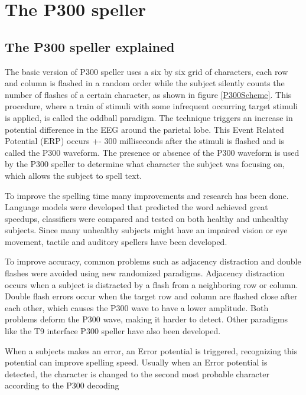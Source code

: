 \section{The P300 speller}
\subsection{The P300 speller explained}
The basic version of P300 speller uses a six by six grid of characters, each row and column is flashed in a random order while the subject silently counts the number of flashes of a certain character, as shown in figure \ref{P300Scheme}. This procedure, where a train of stimuli with some infrequent occurring target stimuli is applied, is called the oddball paradigm. The technique triggers an increase in potential difference in the EEG around the parietal lobe. This Event Related Potential (ERP) occurs +- 300 milliseconds after the stimuli is flashed and is called the P300 waveform\cite{ComparisonClassifications}. The presence or absence of the P300 waveform is used by the P300 speller to determine what character the subject was focusing on, which allows the subject to spell text. 


To improve the spelling time many improvements and research has been done. Language models were developed that predicted the word achieved great speedups\cite{LangModel}, classifiers were compared and tested on both healthy\cite{ClassTechniqueComp} and unhealthy subjects\cite{ComparisonClassifications}. Since many unhealthy subjects might have an impaired vision or eye movement, tactile\cite{TactileP300} and auditory\cite{AuditoryP300} spellers have been developed.

\npar

To improve accuracy, common problems such as adjacency distraction and double flashes were avoided using new randomized paradigms\cite{PaperThibault}. Adjacency distraction occurs when a subject is distracted by a flash from a neighboring row or column. Double flash errors occur when the target row and column are flashed close after each other, which causes the P300 wave to have a lower amplitude. Both problems deform the P300 wave, making it harder to detect. Other paradigms like the T9 interface P300 speller have also been developed\cite{P300T9}.

\npar

When a subjects makes an error, an Error potential is triggered, recognizing this potential can improve spelling speed\cite{ErrorPotentials}. Usually when an Error potential is detected, the character is changed to the second most probable character according to the P300 decoding\cite{ErrSecChar}


